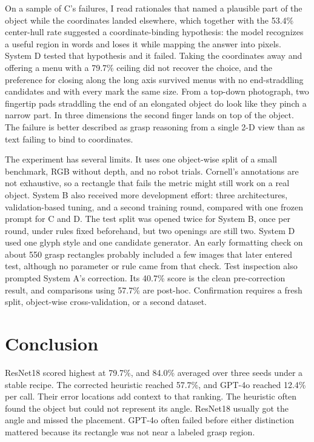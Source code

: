\documentclass[10pt,conference,compsoc]{IEEEtran}
\begin{document}
On a sample of C's failures, I read rationales that named a plausible part of
the object while the coordinates landed elsewhere, which together with the
53.4\% center-hull rate suggested a coordinate-binding hypothesis: the model
recognizes a useful region in words and loses it while mapping the answer
into pixels. System D tested that hypothesis and it failed. Taking the
coordinates away and offering a menu with a 79.7\% ceiling did not recover
the choice, and the preference for closing along the long axis survived
menus with no end-straddling candidates and with every mark the same size.
From a top-down photograph, two fingertip pads straddling the end of an
elongated object do look like they pinch a narrow part. In three dimensions
the second finger lands on top of the object. The failure is better
described as grasp reasoning from a single 2-D view than as text failing to
bind to coordinates.

The experiment has several limits. It uses one object-wise split of a small
benchmark, RGB without depth, and no robot trials. Cornell's annotations are
not exhaustive, so a rectangle that fails the metric might still work on a
real object. System B also received more development effort: three
architectures, validation-based tuning, and a second training round,
compared with one frozen prompt for C and D. The test split was opened
twice for System B, once per round, under rules fixed beforehand, but two
openings are still two. System D used one glyph style and one candidate
generator. An early formatting check on about 550 grasp rectangles probably
included a few images that later entered test, although no parameter or rule
came from that check. Test inspection also prompted System A's correction.
Its 40.7\% score is the clean pre-correction result, and comparisons
using 57.7\% are post-hoc. Confirmation requires a fresh split, object-wise
cross-validation, or a second dataset.

\section{Conclusion}

ResNet18 scored highest at 79.7\%, and 84.0\% averaged over three seeds
under a stable recipe. The corrected heuristic reached 57.7\%, and GPT-4o
reached 12.4\% per call. Their error locations add context to that
ranking. The heuristic often found the object but could not represent
its angle. ResNet18 usually got the angle and missed the placement. GPT-4o
often failed before either distinction mattered because its rectangle was not
near a labeled grasp region.
\end{document}
